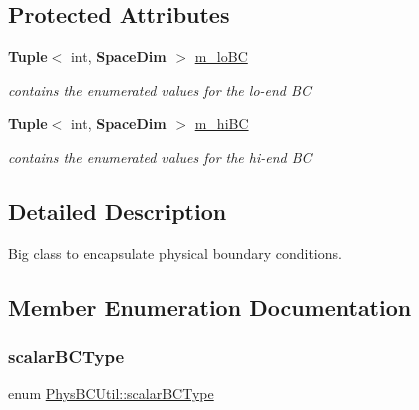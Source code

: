 \subsection*{Protected Attributes}
\begin{DoxyCompactItemize}
\item 
\mbox{\label{class_phys_b_c_util_a4c1aae9e1f5a676c93e0cd3bd7100f0b}} 
\textbf{ Tuple}$<$ int, \textbf{ Space\+Dim} $>$ \hyperlink{class_phys_b_c_util_a4c1aae9e1f5a676c93e0cd3bd7100f0b}{m\+\_\+lo\+BC}
\begin{DoxyCompactList}\small\item\em contains the enumerated values for the lo-\/end BC \end{DoxyCompactList}\item 
\mbox{\label{class_phys_b_c_util_a3469ac43534392033eb7d99c2398947b}} 
\textbf{ Tuple}$<$ int, \textbf{ Space\+Dim} $>$ \hyperlink{class_phys_b_c_util_a3469ac43534392033eb7d99c2398947b}{m\+\_\+hi\+BC}
\begin{DoxyCompactList}\small\item\em contains the enumerated values for the hi-\/end BC \end{DoxyCompactList}\end{DoxyCompactItemize}


\subsection{Detailed Description}
Big class to encapsulate physical boundary conditions. 

\subsection{Member Enumeration Documentation}
\mbox{\label{class_phys_b_c_util_a1beb9821cf9e783e3742b82b7070c97a}} 
\subsubsection{\texorpdfstring{scalar\+B\+C\+Type}{scalarBCType}}
{\footnotesize\ttfamily enum \hyperlink{class_phys_b_c_util_a1beb9821cf9e783e3742b82b7070c97a}{Phys\+B\+C\+Util\+::scalar\+B\+C\+Type}}




